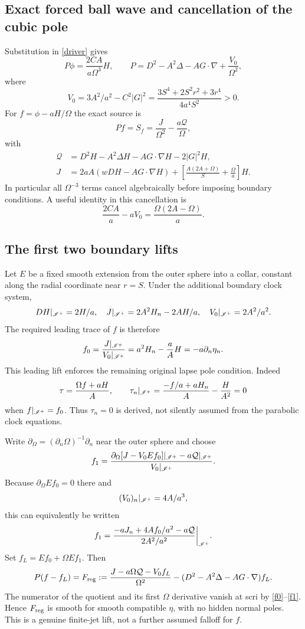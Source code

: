 \subsection{Exact forced ball wave and cancellation of the cubic pole}
Substitution in \eqref{driver} gives
\begin{equation}
 P\phi=\frac{2CA}{a\Omega^3}H,\qquad
 P=D^2-A^2\Delta-AG\cdot\nabla+\frac{V_0}{\Omega^2},\label{Pphi}
\end{equation}
where
\[
 V_0=3A^2/a^2-C^2|G|^2
 =\frac{3S^4+2S^2r^2+3r^4}{4a^4S^2}>0.
\]
For $f=\phi-aH/\Omega$ the exact source is
\begin{equation}
 Pf=S_f=\frac{J}{\Omega^2}-\frac{a\mathcal Q}{\Omega},\label{Sf}
\end{equation}
with
\begin{align}
 \mathcal Q&=D^2H-A^2\Delta H-AG\cdot\nabla H-2|G|^2H,\\
 J&=2aA(wDH-AG\cdot\nabla H)
 +\left[\frac{A(2A+\Omega)}S+\frac\Omega a\right]H.
\end{align}
In particular all $\Omega^{-3}$ terms cancel algebraically before imposing boundary conditions. A useful identity in this cancellation is
\[
 \frac{2CA}{a}-aV_0=\frac{\Omega(2A-\Omega)}a.
\]

\subsection{The first two boundary lifts}
Let $E$ be a fixed smooth extension from the outer sphere into a collar, constant along the radial coordinate near $r=S$. Under the additional boundary clock system,
\[
 DH|_{\mathscr I^+}=2H/a,\quad
 J|_{\mathscr I^+}=2A^2H_n-2AH/a,\quad
 V_0|_{\mathscr I^+}=2A^2/a^2.
\]
The required leading trace of $f$ is therefore
\begin{equation}
 f_0=\frac{J|_{\mathscr I^+}}{V_0|_{\mathscr I^+}}
 =a^2H_n-\frac aA H=-a\partial_n\eta_n.\label{f0}
\end{equation}
This leading lift enforces the remaining original lapse pole condition. Indeed
\[
 \tau=\frac{\Omega f+aH}{A},\qquad
 \tau_n|_{\mathscr I^+}=\frac{-f/a+aH_n}{A}-\frac H{A^2}=0
\]
when $f|_{\mathscr I^+}=f_0$. Thus $\tau_n=0$ is derived, not silently assumed from the parabolic clock equations.

Write $\partial_\Omega=(\partial_n\Omega)^{-1}\partial_n$ near the outer sphere and choose
\begin{equation}
 f_1=\frac{\partial_\Omega[J-V_0E f_0]|_{\mathscr I^+}-a\mathcal Q|_{\mathscr I^+}}
 {V_0|_{\mathscr I^+}}.\label{f1}
\end{equation}
Because $\partial_\Omega E f_0=0$ there and
\[
 (V_0)_n|_{\mathscr I^+}=4A/a^3,
\]
this can equivalently be written
\[
 f_1=\frac{-aJ_n+4Af_0/a^2-a\mathcal Q}{2A^2/a^2}\bigg|_{\mathscr I^+}.
\]
Set $f_L=E f_0+\Omega E f_1$. Then
\begin{equation}
 P(f-f_L)=F_{\rm reg}:=
 \frac{J-a\Omega\mathcal Q-V_0 f_L}{\Omega^2}
 -(D^2-A^2\Delta-AG\cdot\nabla)f_L.\label{Freg}
\end{equation}
The numerator of the quotient and its first $\Omega$ derivative vanish at scri by \eqref{f0}--\eqref{f1}. Hence $F_{\rm reg}$ is smooth for smooth compatible $\eta$, with no hidden normal poles. This is a genuine finite-jet lift, not a further assumed falloff for $f$.

